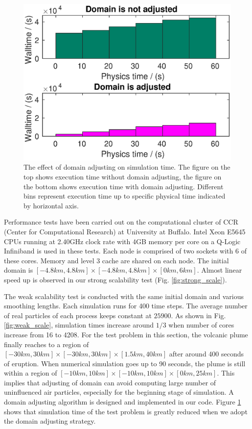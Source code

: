 \documentclass[gmd, manuscript]{copernicus}
\begin{document}
\begin{figure}[!t]
\centering
\includegraphics[scale=0.35]{Fig5}
\caption{The effect of domain adjusting on simulation time. The figure on the top shows execution time without domain adjusting, the figure on the bottom shows execution time with domain adjusting. Different bins represent execution time up to specific physical time indicated by horizontal axis.}
\label{fig:adj_vs_no}
\end{figure}

Performance tests have been carried out on the computational cluster of CCR (Center for Computational Research) at University at Buffalo. Intel Xeon E5645 CPUs running at 2.40GHz clock rate with 4GB memory per core on a Q-Logic Infiniband is used in these tests. Each node is comprised of two sockets with 6 of these cores. Memory and level 3 cache are shared on each node. The initial domain is $[-4.8km, 4.8km] \times [-4.8km,4.8km] \times [0km, 6km]$. Almost linear speed up is observed in our strong scalability test (Fig. \ref{fig:strong_scale}).

The weak scalability test is conducted with the same initial domain and various smoothing lengths. Each simulation runs for 400 time steps. The average number of real particles of each process keeps constant at $25900$. As shown in Fig. \ref{fig:weak_scale}, simulation times increase around $1/3$ when number of cores increase from 16 to 4208. For the test problem in this section, the volcanic plume finally reaches to a region of $[-30km , 30km] \times [-30km, 30km] \times [1.5km, 40km]$ after around 400 seconds of eruption. When numerical simulation goes up to 90 seconds, the plume is still within a region of $[-10km, 10km] \times [-10km, 10km] \times [0km,25km]$. This implies that adjusting of domain can avoid computing large number of uninfluenced air particles, especially for the beginning stage of simulation. A domain adjusting algorithm \citep{cao2017data} is designed and implemented in our code. Figure \ref{fig:adj_vs_no} shows that simulation time of the test problem is greatly reduced when we adopt the domain adjusting strategy.
\end{document}
